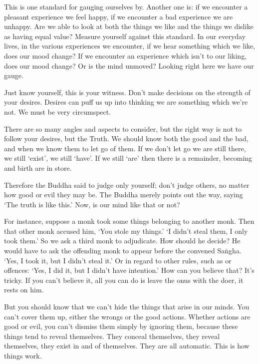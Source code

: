 This is one standard for gauging ourselves by. Another one is: if we encounter a pleasant experience we feel happy, if we encounter a bad experience we are unhappy. Are we able to look at both the things we like and the things we dislike as having equal value? Measure yourself against this standard. In our everyday lives, in the various experiences we encounter, if we hear something which we like, does our mood change? If we encounter an experience which isn't to our liking, does our mood change? Or is the mind unmoved? Looking right here we have our gauge.

Just know yourself, this is your witness. Don't make decisions on the strength of your desires. Desires can puff us up into thinking we are something which we're not. We must be very circumspect.

There are so many angles and aspects to consider, but the right way is not to follow your desires, but the Truth. We should know both the good and the bad, and when we know them to let go of them. If we don't let go we are still there, we still `exist', we still `have'. If we still `are'
then there is a remainder, becoming and birth are in store.

Therefore the Buddha said to judge only yourself; don't judge others, no matter how good or evil they may be. The Buddha merely points out the way, saying `The truth is like this.' Now, is our mind like that or not?

For instance, suppose a monk took some things belonging to another monk. Then that other monk accused him, `You stole my things.' `I didn't steal them, I only took them.' So we ask a third monk to adjudicate. How should he decide? He would have to ask the offending monk to appear before the convened Sa\.ngha. `Yes, I took it, but I didn't steal it.' Or in regard to other rules, such as  or  offences: `Yes, I did it, but I didn't have intention.' How can you believe that? It's tricky. If you can't believe it, all you can do is leave the onus with the doer, it rests on him.

But you should know that we can't hide the things that arise in our minds. You can't cover them up, either the wrongs or the good actions. Whether actions are good or evil, you can't dismiss them simply by ignoring them, because these things tend to reveal themselves. They conceal themselves, they reveal themselves, they exist in and of themselves. They are all automatic. This is how things work.

